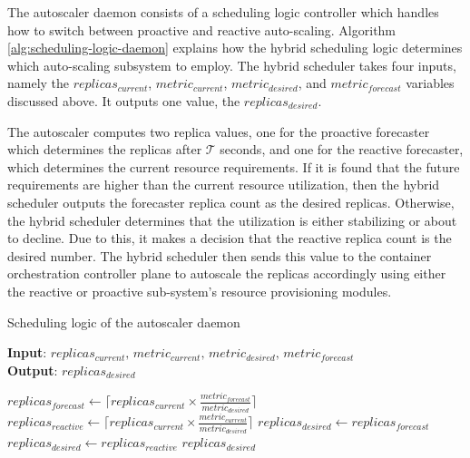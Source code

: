 The autoscaler daemon consists of a scheduling logic controller which handles how to switch between proactive and reactive auto-scaling. Algorithm \ref{alg:scheduling-logic-daemon} explains how the hybrid scheduling logic determines which auto-scaling subsystem to employ. The hybrid scheduler takes four inputs, namely the $replicas_{current}$, $metric_{current}$, $metric_{desired}$, and $metric_{forecast}$ variables discussed above. It outputs one value, the $replicas_{desired}$.\par

The autoscaler computes two replica values, one for the proactive forecaster which determines the replicas after $\mathcal{T}$ seconds, and one for the reactive forecaster, which determines the current resource requirements. If it is found that the future requirements are higher than the current resource utilization, then the hybrid scheduler outputs the forecaster replica count as the desired replicas. Otherwise, the hybrid scheduler determines that the utilization is either stabilizing or about to decline. Due to this, it makes a decision that the reactive replica count is the desired number. The hybrid scheduler then sends this value to the container orchestration controller plane to autoscale the replicas accordingly using either the reactive or proactive sub-system's resource provisioning modules.\par

\begin{algorithm}
    \caption{Scheduling logic of the autoscaler daemon}
    \label{alg:scheduling-logic-daemon}
    \textbf{Input}: $replicas_{current},\, metric_{current},\, metric_{desired},\, metric_{forecast}$\\
    \textbf{Output}: $replicas_{desired}$
    \begin{algorithmic}
        \State $replicas_{forecast} \gets \lceil replicas_{current} \times \frac{metric_{forecast}}{metric_{desired}}\rceil$
        \State $replicas_{reactive} \gets \lceil replicas_{current} \times \frac{metric_{current}}{metric_{desired}}\rceil$
            \State $replicas_{desired} \gets replicas_{forecast}$
        \Else
            \State $replicas_{desired} \gets replicas_{reactive}$
        \EndIf
        \State \Return $replicas_{desired}$
    \end{algorithmic}
\end{algorithm}

